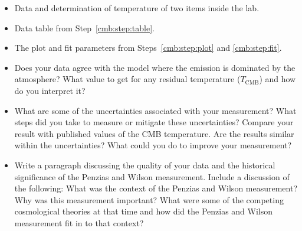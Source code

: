 \begin{itemize}
	\item Data and determination of temperature of two items inside the lab.
	
	\item Data table from Step~\ref{cmb:step:table}.
	
	\item The plot and fit parameters from Steps~\ref{cmb:step:plot} and \ref{cmb:step:fit}.
	
	\item Does your data agree with the model where the emission is dominated by the atmosphere?  What value to get for any residual temperature ($T_\textrm{CMB}$) and how do you interpret it?
	
	\item What are some of the uncertainties associated with your measurement? What steps did you take to measure or mitigate these uncertainties? Compare your result with published values of the CMB temperature. Are the results similar within the uncertainties? What could you do to improve your measurement?
	
	\item Write a paragraph discussing the quality of your data and the historical significance of the Penzias and Wilson measurement. Include a discussion of the following: What was the context of the Penzias and Wilson measurement? Why was this measurement important? What were some of the competing cosmological theories at that time and how did the Penzias and Wilson measurement fit in to that context?
\end{itemize}
